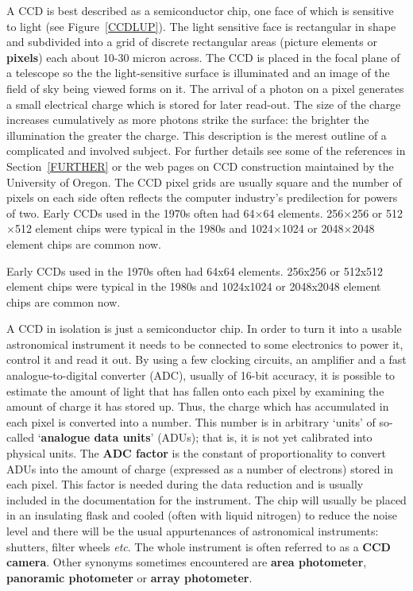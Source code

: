 \documentclass[twoside,11pt]{article}
\newcommand{\htmladdnormallink}[2]{#1}
\newenvironment{latexonly}{}{}
\begin{document}
A CCD is best described as a semiconductor chip, one face of which is
sensitive to light (see Figure~\ref{CCDLUP}).  The light sensitive face is
rectangular in shape and subdivided into a grid of discrete rectangular
areas (picture elements or {\bf pixels}) each about 10-30 micron across.
The CCD is placed in the focal plane of a telescope so the the
light-sensitive surface is illuminated and an image of the field of sky
being viewed forms on it.  The arrival of a photon on a pixel generates a
small electrical charge which is stored for later read-out.  The size of
the charge increases cumulatively as more photons strike the surface: the
brighter the illumination the greater the charge. 
This description is the merest outline of a complicated and involved
subject.  For further details see some of the references in
Section~\ref{FURTHER} or the \htmladdnormallink{web pages on CCD construction}
{http://zebu.uoregon.edu/ccd.html} maintained by the University of Oregon.
The CCD pixel grids are usually square and the number of pixels on each
side often reflects the computer industry's predilection for powers of two.
\begin{latexonly}
Early CCDs used in the 1970s often had 64$\times$64 elements. 256$\times$256
or 512$\times$512 element chips were typical in the 1980s and
1024$\times$1024 or 2048$\times$2048 element chips are common now.
\end{latexonly}
\begin{htmlonly}
Early CCDs used in the 1970s often had 64x64 elements. 256x256 or 512x512
element chips were typical in the 1980s and 1024x1024 or 2048x2048 element
chips are common now.
\end{htmlonly}

A CCD in isolation is just a semiconductor chip.  In order to turn it
into a usable astronomical instrument it needs to be connected to some
electronics to power it, control it and read it out.  By using a few
clocking circuits, an amplifier and a fast analogue-to-digital converter
(ADC), usually of 16-bit accuracy, it is possible to estimate the amount of
light that has fallen onto each pixel by examining the amount of charge it
has stored up.  Thus, the charge which has accumulated in each pixel is
converted into a number.  This number is in arbitrary `units' of so-called
`{\bf analogue data units}' (ADUs); that is, it is not yet calibrated into
physical units.  The {\bf ADC factor} is the constant of proportionality
to convert ADUs into the amount of charge (expressed as a number of
electrons) stored in each pixel.  This factor is needed during the data
reduction and is usually included in the documentation for the instrument.
The chip will usually be placed in an insulating flask and cooled (often
with liquid nitrogen) to reduce the noise level and there will be the usual
appurtenances of astronomical instruments: shutters, filter wheels
\emph{etc}.  The whole instrument is often referred to as a {\bf CCD camera}.
Other synonyms sometimes encountered are {\bf area photometer}, {\bf
panoramic photometer} or {\bf array photometer}.
\end{document}
